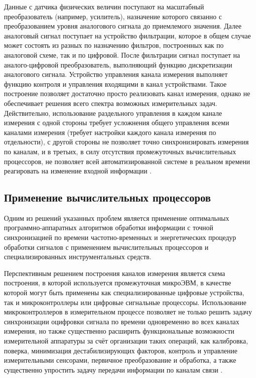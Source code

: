 \documentclass[a4paper, 14pt, titlepage]{extarticle}
\begin{document}
  Данные с датчика физических величин поступают на масштабный преобразователь (например, усилитель),
  назначение которого связанно с преобразованием уровня аналогового сигнала до приемлемого значения.
  Далее аналоговый сигнал поступает на устройство фильтрации, которое в общем случае может состоять
  из разных по назначению фильтров, построенных как по аналоговой схеме, так и по цифровой. После
  фильтрации сигнал поступает на аналого-цифровой преобразователь, выполняющий
  функцию дискретизации аналогового сигнала. Устройство управления канала измерения
  выполняет функцию контроля и управления входящими в канал устройствами. Такое построение позволяет
  достаточно просто реализовать канал измерения, однако не обеспечивает решения всего спектра
  возможных измерительных задач. Действительно, использование раздельного управления в каждом канале
  измерения с одной стороны требует усложнения общего управления всеми каналами измерения (требует
  настройки каждого канала измерения по отдельности), с другой стороны не позволяет точно
  синхронизировать измерения по каналам, и в третьих, в силу отсутствия промежуточных вычислительных
  процессоров, не позволяет всей автоматизированной системе в реальном времени реагировать на
  изменение входной информации \cite{stupin-methods}.

  \subsection{Применение вычислительных процессоров}

  Одним из решений указанных проблем является применение оптимальных программно-аппаратных
  алгоритмов обработки информации с точной синхронизацией по времени частотно-временных и
  энергетических процедур обработки сигналов с применением вычислительных процессоров и
  специализированных инструментальных средств.

  Перспективным решением построения каналов измерения является схема построения, в которой
  используется промежуточная микроЭВМ, в качестве которой могут быть применены как
  специализированные цифровые устройства, так и микроконтроллеры или цифровые сигнальные процессоры.
  Использование микроконтроллеров в измерительном процессе позволяет не только решить задачу
  синхронизации оцифровки сигнала по времени одновременно во всех каналах измерения, но также
  существенно расширить функциональные возможности измерительной аппаратуры за счёт организации
  таких операций, как калибровка, поверка, минимизация дестабилизирующих факторов, контроль и
  управление измерительными сенсорами, первичное преобразование и обработка, а также существенно
  упростить задачу передачи информации по каналам связи \cite{klaassen-methods}.
\end{document}
